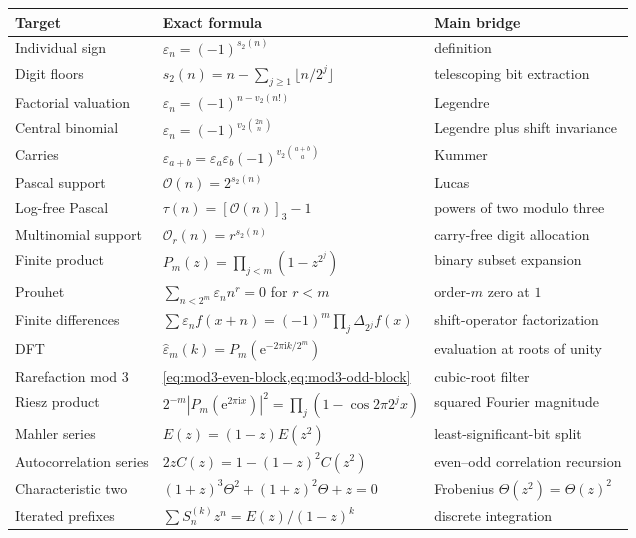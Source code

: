 \documentclass[11pt,oneside]{article}
\theoremstyle{definition}
\theoremstyle{remark}
\newcommand{\e}{\mathrm e}
\newcommand{\ii}{\mathrm i}
\newcommand{\vtwo}{v_2}
\newcommand{\bitsum}{s_2}
\newcommand{\eps}{\varepsilon}
\begin{document}
\begin{longtable}{>{\raggedright\arraybackslash}p{}
                  >{\raggedright\arraybackslash}p{}
                  >{\raggedright\arraybackslash}p{}}
\toprule
Target & Exact formula & Main bridge \\
\midrule
\endhead
Individual sign & $\eps_n=(-1)^{\bitsum(n)}$ & definition \\
Digit floors & $\bitsum(n)=n-\sum_{j\ge1}\lfloor n/2^j\rfloor$ & telescoping bit extraction \\
Factorial valuation & $\eps_n=(-1)^{n-\vtwo(n!)}$ & Legendre \\
Central binomial & $\eps_n=(-1)^{\vtwo\binom{2n}{n}}$ & Legendre plus shift invariance \\
Carries & $\eps_{a+b}=\eps_a\eps_b(-1)^{\vtwo\binom{a+b}{a}}$ & Kummer \\
Pascal support & $\mathcal O(n)=2^{\bitsum(n)}$ & Lucas \\
Log-free Pascal & $\tau(n)=[\mathcal O(n)]_3-1$ & powers of two modulo three \\
Multinomial support & $\mathcal O_r(n)=r^{\bitsum(n)}$ & carry-free digit allocation \\
Finite product & $P_m(z)=\prod_{j<m}(1-z^{2^j})$ & binary subset expansion \\
Prouhet & $\sum_{n<2^m}\eps_nn^r=0$ for $r<m$ & order-$m$ zero at $1$ \\
Finite differences & $\sum\eps_nf(x+n)=(-1)^m\prod_j\Delta_{2^j}f(x)$ & shift-operator factorization \\
DFT & $\widehat\eps_m(k)=P_m(\e^{-2\pi\ii k/2^m})$ & evaluation at roots of unity \\
Rarefaction mod $3$ & \cref{eq:mod3-even-block,eq:mod3-odd-block} & cubic-root filter \\
Riesz product & $2^{-m}|P_m(\e^{2\pi\ii x})|^2=\prod_j(1-\cos2\pi2^jx)$ & squared Fourier magnitude \\
Mahler series & $E(z)=(1-z)E(z^2)$ & least-significant-bit split \\
Autocorrelation series & $2zC(z)=1-(1-z)^2C(z^2)$ & even--odd correlation recursion \\
Characteristic two & $(1+z)^3\Theta^2+(1+z)^2\Theta+z=0$ & Frobenius $\Theta(z^2)=\Theta(z)^2$ \\
Iterated prefixes & $\sum S_n^{(k)}z^n=E(z)/(1-z)^k$ & discrete integration \\
\bottomrule
\end{longtable}
\end{document}
